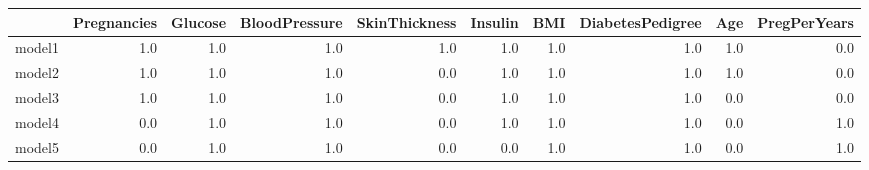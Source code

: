 \begin{tabular}{lrrrrrrrrr}
\toprule
{} &  Pregnancies &  Glucose &  BloodPressure &  SkinThickness &  Insulin &  BMI &  DiabetesPedigree &  Age &  PregPerYears \\
\midrule
model1 &          1.0 &      1.0 &            1.0 &            1.0 &      1.0 &  1.0 &               1.0 &  1.0 &           0.0 \\
model2 &          1.0 &      1.0 &            1.0 &            0.0 &      1.0 &  1.0 &               1.0 &  1.0 &           0.0 \\
model3 &          1.0 &      1.0 &            1.0 &            0.0 &      1.0 &  1.0 &               1.0 &  0.0 &           0.0 \\
model4 &          0.0 &      1.0 &            1.0 &            0.0 &      1.0 &  1.0 &               1.0 &  0.0 &           1.0 \\
model5 &          0.0 &      1.0 &            1.0 &            0.0 &      0.0 &  1.0 &               1.0 &  0.0 &           1.0 \\
\bottomrule
\end{tabular}

